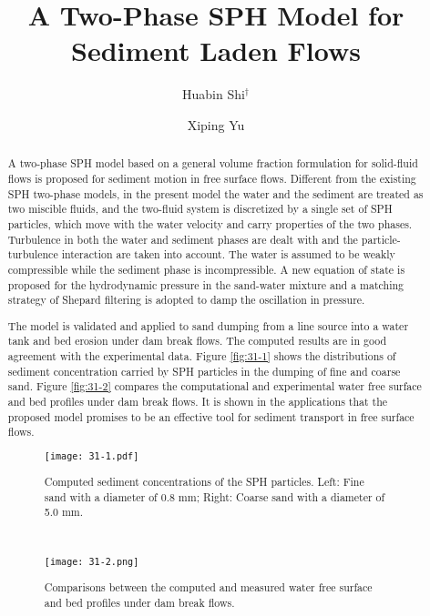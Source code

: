 \documentclass[10pt]{article}
\title{A Two-Phase SPH Model for Sediment Laden Flows}
\date{}
\author[$\relax$]{Huabin Shi$^\dagger$}
\author[$\relax$]{Xiping Yu}
\affil[$\relax$]{Tsinghua University, Beijing, China}
\affil[$\relax$]{\email{\dagger}{shihuabin@tsinghua.edu.cn}}
\begin{document}
\maketitle


\begin{abstract}
A two-phase SPH model based on a general volume fraction formulation for solid-fluid flows is proposed for sediment motion in free surface flows. Different from the existing SPH two-phase models, in the present model the water and the sediment are treated as two miscible fluids, and the two-fluid system is discretized by a single set of SPH particles, which move with the water velocity and carry properties of the two phases. Turbulence in both the water and sediment phases are dealt with and the particle-turbulence interaction are taken into account. The water is assumed to be weakly compressible while the sediment phase is incompressible. A new equation of state is proposed for the hydrodynamic pressure in the sand-water mixture and a matching strategy of Shepard filtering is adopted to damp the oscillation in pressure.

The model is validated and applied to sand dumping from a line source into a water tank and bed erosion under dam break flows. The computed results are in good agreement with the experimental data. Figure \ref{fig:31-1} shows the distributions of sediment concentration carried by SPH particles in the dumping of fine and coarse sand. Figure \ref{fig:31-2} compares the computational and experimental water free surface and bed profiles under dam break flows. It is shown in the applications that the proposed model promises to be an effective tool for sediment transport in free surface flows.

\begin{figure}[!htb]
\begin{minipage}[b]{0.46\linewidth}
\centering
\texttt{[image: 31-1.pdf]}
\caption{Computed sediment concentrations of the SPH particles. Left: Fine sand with a diameter of 0.8 mm; Right: Coarse sand with a diameter of 5.0 mm.}\label{fig:31-1}
\end{minipage}
\begin{minipage}[b]{0.05\linewidth}
~
\end{minipage}
\begin{minipage}[b]{0.46\linewidth}
\centering
\texttt{[image: 31-2.png]}
\caption{Comparisons between the computed and measured water free surface and bed profiles under dam break flows.}\label{fig:31-2}
\end{minipage}
\end{figure}


\end{abstract}



\addbib
\end{document}
